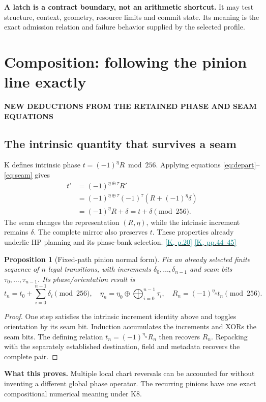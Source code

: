 \documentclass[11pt,a4paper]{article}
\newcommand{\kref}[1]{\hyperlink{baseline.#1}{\textcolor{teal}{[K, p.#1]}}}
\newcommand{\krange}[2]{\hyperlink{baseline.#1}{\textcolor{teal}{[K, pp.#1--#2]}}}
\newcommand{\status}[1]{{\sffamily\bfseries\scriptsize\color{teal}#1}\par}
\newcommand{\sectionstart}[1]{\par\addvspace{18pt}\Needspace{12\baselineskip}\section{#1}}
\theoremstyle{lpstyle}
\newtheorem{theorem}{Proposition}[section]
\newcommand{\sbit}[1]{(-1)^{#1}}
\begin{document}
\begin{principle}
\textbf{A latch is a contract boundary, not an arithmetic shortcut.} It may test structure, context, geometry, resource limits and commit state. Its meaning is the exact admission relation and failure behavior supplied by the selected profile.
\end{principle}

\sectionstart{Composition: following the pinion line exactly}
\status{NEW DEDUCTIONS FROM THE RETAINED PHASE AND SEAM EQUATIONS}
\subsection{The intrinsic quantity that survives a seam}
K defines intrinsic phase $t=\sbit{\eta}R\bmod256$. Applying equations \eqref{eq:depart}--\eqref{eq:seam} gives
\begin{align*}
t'&=\sbit{\eta\oplus\tau}R'\\
&=\sbit{\eta\oplus\tau}\sbit{\tau}(R+\sbit{\eta}\delta)\\
&=\sbit{\eta}R+\delta=t+\delta\pmod{256}.
\end{align*}
The seam changes the representation $(R,\eta)$, while the intrinsic increment remains $\delta$. The complete mirror also preserves $t$. These properties already underlie HP planning and its phase-bank selection. \kref{20} \krange{44}{45}

\begin{theorem}[Fixed-path pinion normal form]
Fix an already selected finite sequence of $n$ legal transitions, with increments $\delta_0,\ldots,\delta_{n-1}$ and seam bits $\tau_0,\ldots,\tau_{n-1}$. Its phase/orientation result is
\[
\boxed{
 t_n=t_0+\sum_{i=0}^{n-1}\delta_i\pmod{256},\quad
 \eta_n=\eta_0\oplus\bigoplus_{i=0}^{n-1}\tau_i,\quad
 R_n=\sbit{\eta_n}t_n\pmod{256}.}
\]
\end{theorem}
\begin{proof}
One step satisfies the intrinsic increment identity above and toggles orientation by its seam bit. Induction accumulates the increments and XORs the seam bits. The defining relation $t_n=\sbit{\eta_n}R_n$ then recovers $R_n$. Repacking with the separately established destination, field and metadata recovers the complete pair.
\end{proof}

\textbf{What this proves.} Multiple local chart reversals can be accounted for without inventing a different global phase operator. The recurring pinions have one exact compositional numerical meaning under K8.
\end{document}
